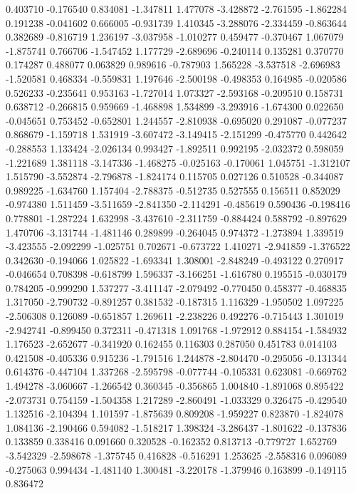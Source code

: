 0.403710
-0.176540
0.834081
-1.347811
1.477078
-3.428872
-2.761595
-1.862284
0.191238
-0.041602
0.666005
-0.931739
1.410345
-3.288076
-2.334459
-0.863644
0.382689
-0.816719
1.236197
-3.037958
-1.010277
0.459477
-0.370467
1.067079
-1.875741
0.766706
-1.547452
1.177729
-2.689696
-0.240114
0.135281
0.370770
0.174287
0.488077
0.063829
0.989616
-0.787903
1.565228
-3.537518
-2.696983
-1.520581
0.468334
-0.559831
1.197646
-2.500198
-0.498353
0.164985
-0.020586
0.526233
-0.235641
0.953163
-1.727014
1.073327
-2.593168
-0.209510
0.158731
0.638712
-0.266815
0.959669
-1.468898
1.534899
-3.293916
-1.674300
0.022650
-0.045651
0.753452
-0.652801
1.244557
-2.810938
-0.695020
0.291087
-0.077237
0.868679
-1.159718
1.531919
-3.607472
-3.149415
-2.151299
-0.475770
0.442642
-0.288553
1.133424
-2.026134
0.993427
-1.892511
0.992195
-2.032372
0.598059
-1.221689
1.381118
-3.147336
-1.468275
-0.025163
-0.170061
1.045751
-1.312107
1.515790
-3.552874
-2.796878
-1.824174
0.115705
0.027126
0.510528
-0.344087
0.989225
-1.634760
1.157404
-2.788375
-0.512735
0.527555
0.156511
0.852029
-0.974380
1.511459
-3.511659
-2.841350
-2.114291
-0.485619
0.590436
-0.198416
0.778801
-1.287224
1.632998
-3.437610
-2.311759
-0.884424
0.588792
-0.897629
1.470706
-3.131744
-1.481146
0.289899
-0.264045
0.974372
-1.273894
1.339519
-3.423555
-2.092299
-1.025751
0.702671
-0.673722
1.410271
-2.941859
-1.376522
0.342630
-0.194066
1.025822
-1.693341
1.308001
-2.848249
-0.493122
0.270917
-0.046654
0.708398
-0.618799
1.596337
-3.166251
-1.616780
0.195515
-0.030179
0.784205
-0.999290
1.537277
-3.411147
-2.079492
-0.770450
0.458377
-0.468835
1.317050
-2.790732
-0.891257
0.381532
-0.187315
1.116329
-1.950502
1.097225
-2.506308
0.126089
-0.651857
1.269611
-2.238226
0.492276
-0.715443
1.301019
-2.942741
-0.899450
0.372311
-0.471318
1.091768
-1.972912
0.884154
-1.584932
1.176523
-2.652677
-0.341920
0.162455
0.116303
0.287050
0.451783
0.014103
0.421508
-0.405336
0.915236
-1.791516
1.244878
-2.804470
-0.295056
-0.131344
0.614376
-0.447104
1.337268
-2.595798
-0.077744
-0.105331
0.623081
-0.669762
1.494278
-3.060667
-1.266542
0.360345
-0.356865
1.004840
-1.891068
0.895422
-2.073731
0.754159
-1.504358
1.217289
-2.860491
-1.033329
0.326475
-0.429540
1.132516
-2.104394
1.101597
-1.875639
0.809208
-1.959227
0.823870
-1.824078
1.084136
-2.190466
0.594082
-1.518217
1.398324
-3.286437
-1.801622
-0.137836
0.133859
0.338416
0.091660
0.320528
-0.162352
0.813713
-0.779727
1.652769
-3.542329
-2.598678
-1.375745
0.416828
-0.516291
1.253625
-2.558316
0.096089
-0.275063
0.994434
-1.481140
1.300481
-3.220178
-1.379946
0.163899
-0.149115
0.836472

